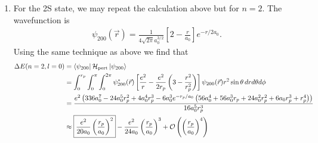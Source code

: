\documentclass{book}
\theoremstyle{definition}
\newcommand{\ham}{\mathcal{H}}
\newcommand{\f}[2]{\frac{#1}{#2}}
\newcommand{\lp}{\left(}
\newcommand{\rp}{\right)}
\newcommand{\lb}{\left[}
\newcommand{\rb}{\right]}
\begin{document}
\begin{enumerate}[label=(\alph*)]
	
	The numerical value for this first order correction is
	\begin{align*}
		\Delta E(n=1,l=0) = \f{4}{5} \times 13.6 \text{ eV } \times  \lp \f{0.9 \times 10^{-15} \text{ m}}{5.29 \times 10^{-11} \text{ m}} \rp^2 \approx \boxed{3.148 \times 10^{-9} \text{ eV}} 
	\end{align*}
	Converting this to frequency we find $\omega (n=1,l=0) \approx 2\pi \cdot 761 \text{ kHz}$. \\
	
	
	Mathematica code:
	\begin{lstlisting}
		(*define psi_100*)
		In[4]:= psi100 = (1/Sqrt[Pi])*(1/a0)^(3/2)*Exp[-r/a0];
		
		(*Evaluate integral*)
		In[5]:= Integrate[
		psi100*psi100*(e^2/r - (e^2/(2*rp))*(3 - r^2/rp^2))*r^2*Sin[t], {r, 
			0, rp}, {t, 0, Pi}, {p, 0, 2 Pi}] // FullSimplify
		
		Out[5]= (e^2 (3 a0^3 - 3 a0 rp^2 + 2 rp^3 - 
		3 a0 E^(-((2 rp)/a0)) (a0 + rp)^2))/(2 a0 rp^3)
		
		(*get corrections term by term by expanding the exponential*)
		In[29]:= FullSimplify[Series[Exp[-x], {x, 0, 6}]] /. {x -> 2*rp/a0}
		
		Out[29]= SeriesData[2 a0^(-1) rp, 0, {1, -1, 
			Rational[1, 2], 
			Rational[-1, 6], 
			Rational[1, 24], 
			Rational[-1, 120], 
			Rational[1, 720]}, 0, 7, 1]
		
		In[32]:= 1/(2 a0 rp^3)
		e^2 (3 a0^3 - 3 a0 rp^2 + 2 rp^3 - 
		3 a0 (1 - (2 rp)/a0 + 1/2 ((2 rp)/a0)^2 - 1/6 ((2 rp)/a0)^3 + 
		1/24 ((2 rp)/a0)^4 - 1/120 ((2 rp)/a0)^5 + 
		1/720 ((2 rp)/a0)^6) (a0 + rp)^2) // Expand
		
		Out[32]= (2 e^2 rp^2)/(5 a0^3) - (e^2 rp^3)/(3 a0^4) + (2 e^2 rp^4)/(
		15 a0^5) - (2 e^2 rp^5)/(15 a0^6)
	\end{lstlisting}
	
	
	
	\item For the 2S state, we may repeat the calculation above but for $n=2$. The wavefunction is 
	\begin{align*}
		\psi_{200}(\vec{r}) = \f{1}{4\sqrt{2 \pi} a_0^{3/2}} \lb 2 - \f{r}{a_0} \rb e^{-r/2a_0}.
	\end{align*}
	Using the same technique as above we find that
	\begin{align*}
		\Delta E(n=2,l=0) 
		&= \bra{\psi_{200}} \ham_\text{pert} \ket{\psi_{200}} \\
		&= \int_0^{r_p} \int_0^{\pi}\int_0^{2\pi} \psi^*_{200}(\vec{r}) \lb \f{e^2}{r} - \f{e^2}{2r_p}\lp 3 - \f{r^2}{r_p^2} \rp  \rb \psi_{200}(\vec{r}) r^2 \sin\theta\,drd\theta d\phi \\
		&= \frac{e^2 \left(336 a_0^7-24 a_0^5 r_p^2+4 a_0^4 r_p^3-6
			a_0^3 e^{-r_p/a_0} \left(56 a_0^4+56 a_0^3
			r_p+24 a_0^2 r_p^2+6 a_0
			r_p^3+r_p^4\right)\right)}{16 a_0^5 r_p^3}\\
		&\approx \boxed{\f{e^2}{20a_0} \lp \f{r_p}{a_0} \rp^2} - \f{e^2}{24 a_0}\lp \f{r_p}{a_0} \rp^3 + \mathcal{O}\lp \lp \f{r_p}{a_0}\rp ^4\rp 
	\end{align*}
	

\end{enumerate}
\end{document}
